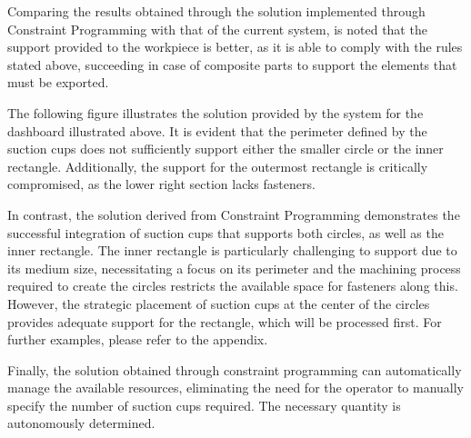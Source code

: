 \documentclass[runningheads]{llncs}
\begin{document}
Comparing the results obtained through the solution implemented through Constraint Programming with that of the current system, is noted that the support provided to the workpiece is better, as it is able to comply with the rules stated above, succeeding in case of composite parts to support the elements that must be exported.

The following figure illustrates the solution provided by the system for the dashboard illustrated above. It is evident that the perimeter defined by the suction cups does not sufficiently support either the smaller circle or the inner rectangle. Additionally, the support for the outermost rectangle is critically compromised, as the lower right section lacks fasteners.

In contrast, the solution derived from Constraint Programming demonstrates the successful integration of suction cups that supports both circles, as well as the inner rectangle. The inner rectangle is particularly challenging to support due to its medium size, necessitating a focus on its perimeter and the machining process required to create the circles restricts the available space for fasteners along this. However, the strategic placement of suction cups at the center of the circles provides adequate support for the rectangle, which will be processed first. For further examples, please refer to the appendix.

Finally, the solution obtained through constraint programming can automatically manage the available resources, eliminating the need for the operator to manually specify the number of suction cups required. The necessary quantity is autonomously determined.


\end{document}
